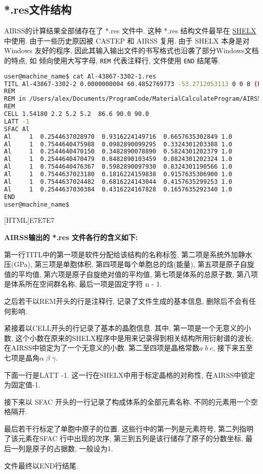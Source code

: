 \documentclass[a4paper, 10pt]{article}
\begin{document}
\subsection{*.res文件结构}
AIRSS的计算结果全部储存在了 *.res 文件中. 这种 *.res 结构文件最早在 \href{https://strucbio.biologie.uni-konstanz.de/ccp4wiki/index.php/SHELXL}{SHELX} 中使用. 由于一些历史原因被 CASTEP 和 AIRSS 复用. 由于 SHELX 本身是对 Windows 友好的程序, 因此其输入输出文件的书写格式也沿袭了部分Windows文档的特点, 如 倾向使用大写字母, \verb|REM| 代表注释行, 文件使用 \verb|END| 结尾等.

\begin{lstlisting}[language={bash}]
user@machine_name$ cat Al-43867-3302-1.res
TITL Al-43867-3302-2 0.0000000004 60.4852769773 -53.2712053113 0 0 8 (P63/mmc) n - 1
REM
REM in /Users/alex/Documents/ProgramCode/MaterialCalculateProgram/AIRSS/airss-0.9/examples/1.1
REM
CELL 1.54180 2.2 5.2 5.2  86.6 90.0 90.0
LATT -1
SFAC Al 
Al     1  0.2544637028970  0.9316224149716  0.6657635302849 1.0
Al     1  0.7544640475988  0.0982890099295  0.3324301203388 1.0
Al     1  0.2544640470150  0.3482890078890  0.5824301202379 1.0
Al     1  0.2544640470479  0.8482890103459  0.0824301202324 1.0
Al     1  0.7544640476367  0.5982890097930  0.8324301190566 1.0
Al     1  0.7544637023180  0.1816224159838  0.9157635306900 1.0
Al     1  0.7544637024482  0.6816224143044  0.4157635299253 1.0
Al     1  0.2544637030384  0.4316224167828  0.1657635292340 1.0
END
user@machine_name$
\end{lstlisting}

\noindent{}[HTML]{E7E7E7}{\parbox{\textwidth}{%
\noindent \textbf{AIRSS输出的 *.res 文件各行的含义如下:}
\begin{maineu}
\item 第一行TITL中的第一项是软件分配给该结构的名称标签, 第二项是系统外加静水压(GPa), 第三项是单胞体积, 第四项是每个单胞总的焓(能量), 第五项是原子自旋值的平均值, 第六项是原子自旋绝对值的平均值, 第七项是体系的总原子数, 第八项是体系所在空间群名称, 最后一项是固定字符 n - 1.
\item 之后若干以REM开头的行是注释行, 记录了文件生成的基本信息, 删除后不会有任何影响.
\item 紧接着以CELL开头的行记录了基本的晶胞信息. 其中, 第一项是一个无意义的小数, 这个小数在原来的SHELX程序中是用来记录得到相关结构所用衍射谱的波长, 在AIRSS中锁定为了一个无意义的小数. 第二至四项是晶格常数\(a\;b\;c\), 接下来五至七项是晶角\(\alpha\;\beta\;\gamma\).
\item 下面一行是LATT -1. 这一行在SHELX中用于标定晶格的对称性, 在AIRSS中锁定为固定值-1.
\item 接下来以 SFAC 开头的一行记录了构成体系的全部元素名称, 不同的元素用一个空格隔开.
\item 最后若干行标定了单胞中原子的位置. 这些行中的第一列是元素符号, 第二列指明了该元素在SFAC 行中出现的次序, 第三到五列是该行储存了原子的分数坐标, 最后一列是原子的占据数, 一般设为1.
\item 文件最终以END行结尾.
\end{maineu}}}\\
\end{document}
